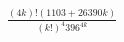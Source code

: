 \documentclass[preview]{standalone}
\begin{document}
\begin{align*}
\frac{(4k)!(1103+26390k)}{(k!)^4 396^{4k}}
\end{align*}
\end{document}
